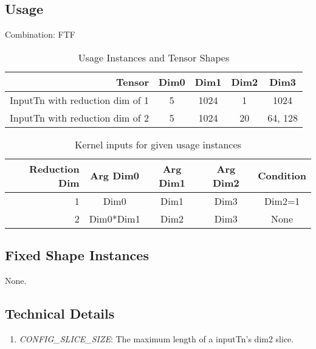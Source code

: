 \subsection{Usage}
Combination: FTF
\vspace{0.5cm}
\begin{table}[htbp] %
\caption{Usage Instances and Tensor Shapes}
	\begin{center}
		\begin{tabular}{|r|c|c|c|c|} 
		\hline	
		Tensor & Dim0 & Dim1 & Dim2 & Dim3\\ 
		\hline	
		InputTn with reduction dim of 1 &
			5 &
			1024 &
			1 &
			1024 \\ 
		\hline	
		InputTn with reduction dim of 2 &
			5 &
			1024 &
			20 &
			64, 128 \\ 
		\hline
		\end{tabular}
	\end{center}
\end{table}

\begin{table}[htbp] %
\caption{Kernel inputs for given usage instances}
	\begin{center}
		\begin{tabular}{|r|c|c|c|c|} 
		\hline	
		Reduction Dim & Arg Dim0 & Arg Dim1 & Arg Dim2 & Condition\\ 
		\hline	
		1 &
			Dim0 &
			Dim1 &
			Dim3 &
			Dim2=1 \\ 
		\hline	
		2 &
			Dim0*Dim1 &
			Dim2 &
			Dim3 &
			None \\ 
		\hline
		\end{tabular}
	\end{center}
\end{table}

\subsection{Fixed Shape Instances}
None.

\subsection{Technical Details}
\begin{enumerate}
\item \emph{CONFIG\_SLICE\_SIZE}: The maximum length of a inputTn's dim2 slice.
\end{enumerate}






